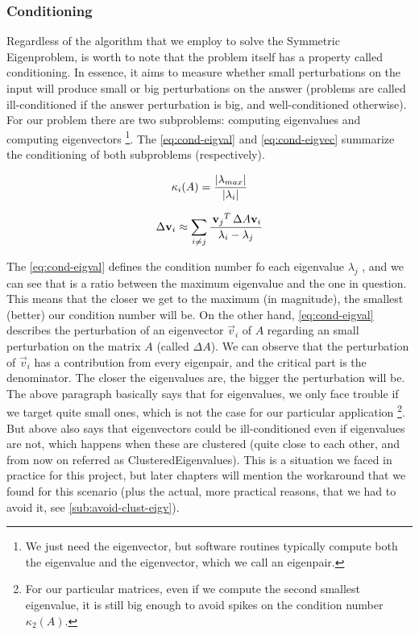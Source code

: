 \subsubsection{Conditioning}
Regardless of the algorithm that we employ to solve the Symmetric
Eigenproblem, is worth to note that the problem itself has a property
called conditioning. In essence, it aims to measure whether small
perturbations on the input will produce small or big perturbations on the
answer (problems are called ill-conditioned if the answer perturbation
is big, and well-conditioned otherwise). For our problem there are two subproblems:
computing eigenvalues and computing eigenvectors \footnote{We
just need the eigenvector, but software routines typically compute both the
eigenvalue and the eigenvector, which we call an eigenpair.}. The
\cref{eq:cond-eigval} and \cref{eq:cond-eigvec} summarize the
conditioning of both subproblems (respectively).

\begin{equation}
  \label{eq:cond-eigval}
  \kappa_{i}(A) = \dfrac{\left\lvert \lambda_{max} \right\vert}{\left\lvert \lambda_i \right\vert}
\end{equation}

\begin{equation}
  \label{eq:cond-eigvec}
  \Delta \mathbf{v}_i \approx \sum\limits_{\tiny{i \ne j}}
  \dfrac{\,{\mathbf{v}_j}^{T}\, \Delta A \mathbf{v}_i}{\lambda_i - \lambda_j}  
\end{equation}
\joinbelow{1cm}

The \cref{eq:cond-eigval} defines the condition number fo each
eigenvalue $\lambda_j$ , and we can see that is a ratio between the maximum
eigenvalue and the one in question. This means that the closer we get
to the maximum (in magnitude), the smallest (better) our condition number will be. On
the other hand, \cref{eq:cond-eigval} describes the perturbation of an
eigenvector $\vec{v}_i$ of $A$ regarding an small perturbation on the
matrix $A$ (called $\Delta A$). We can observe that the perturbation of
$\vec{v}_i$ has a 
contribution from every eigenpair, and the critical part is the
denominator. The closer the eigenvalues are, the bigger the
perturbation will be. \\

The above paragraph basically says that for eigenvalues, we only face
trouble if we target quite small ones, which is not the case for our
particular application \footnote{For our particular matrices, even if
  we compute the
  second smallest eigenvalue, it is still big enough to avoid spikes
  on the condition 
number $\kappa_{2}(A)$.}. But above also says that
eigenvectors could be ill-conditioned even if eigenvalues are not,
which happens when these are clustered (quite close to each
other, and from now on referred as \gls{ClusteredEigenvalues}). This
is a situation we faced in practice for this project, but 
later chapters will mention the workaround that we found for this
scenario (plus the actual, more practical reasons, that we had to avoid
it, see \cref{sub:avoid-clust-eigv}). 

